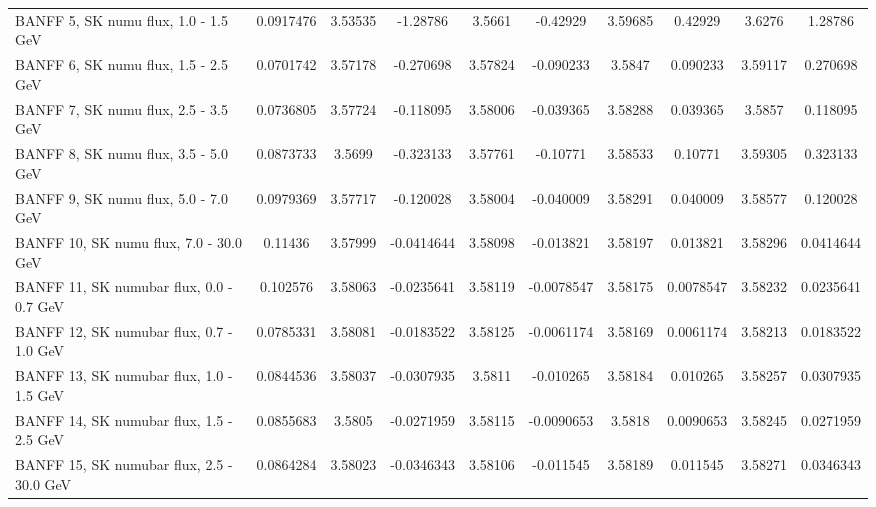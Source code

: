 {\begin{landscape}
\begin{table}
{\begin{tabular}{| l | S | S  S | S  S | S  S | S  S | }
      BANFF  5, SK numu flux, 1.0 - 1.5 GeV     &       0.0917476 &         3.53535 &        -1.28786 &          3.5661 &        -0.42929 &         3.59685 &         0.42929 &          3.6276 &         1.28786 \\ 
      BANFF  6, SK numu flux, 1.5 - 2.5 GeV     &       0.0701742 &         3.57178 &       -0.270698 &         3.57824 &       -0.090233 &          3.5847 &        0.090233 &         3.59117 &        0.270698 \\ 
      BANFF  7, SK numu flux, 2.5 - 3.5 GeV     &       0.0736805 &         3.57724 &       -0.118095 &         3.58006 &       -0.039365 &         3.58288 &        0.039365 &          3.5857 &        0.118095 \\ 
      BANFF  8, SK numu flux, 3.5 - 5.0 GeV     &       0.0873733 &          3.5699 &       -0.323133 &         3.57761 &        -0.10771 &         3.58533 &         0.10771 &         3.59305 &        0.323133 \\ 
      BANFF  9, SK numu flux, 5.0 - 7.0 GeV     &       0.0979369 &         3.57717 &       -0.120028 &         3.58004 &       -0.040009 &         3.58291 &        0.040009 &         3.58577 &        0.120028 \\ 
      BANFF 10, SK numu flux, 7.0 - 30.0 GeV    &         0.11436 &         3.57999 &      -0.0414644 &         3.58098 &       -0.013821 &         3.58197 &        0.013821 &         3.58296 &       0.0414644 \\ 
      BANFF 11, SK numubar flux, 0.0 - 0.7 GeV  &        0.102576 &         3.58063 &      -0.0235641 &         3.58119 &      -0.0078547 &         3.58175 &       0.0078547 &         3.58232 &       0.0235641 \\ 
      BANFF 12, SK numubar flux, 0.7 - 1.0 GeV  &       0.0785331 &         3.58081 &      -0.0183522 &         3.58125 &      -0.0061174 &         3.58169 &       0.0061174 &         3.58213 &       0.0183522 \\ 
      BANFF 13, SK numubar flux, 1.0 - 1.5 GeV  &       0.0844536 &         3.58037 &      -0.0307935 &          3.5811 &       -0.010265 &         3.58184 &        0.010265 &         3.58257 &       0.0307935 \\ 
      BANFF 14, SK numubar flux, 1.5 - 2.5 GeV  &       0.0855683 &          3.5805 &      -0.0271959 &         3.58115 &      -0.0090653 &          3.5818 &       0.0090653 &         3.58245 &       0.0271959 \\ 
      BANFF 15, SK numubar flux, 2.5 - 30.0 GeV &       0.0864284 &         3.58023 &      -0.0346343 &         3.58106 &       -0.011545 &         3.58189 &        0.011545 &         3.58271 &       0.0346343 \\ 

\end{tabular}}
\end{table}
\end{landscape}}

